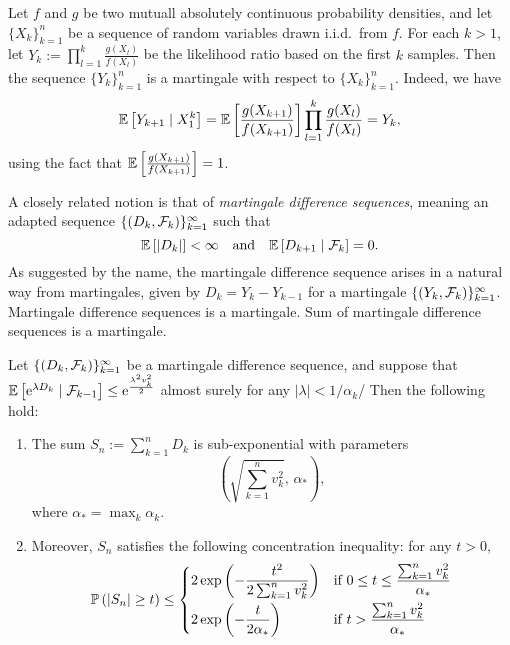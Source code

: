 \begin{example}
	Let \(f\) and \(g\) be two mutuall absolutely continuous probability densities, and let \(\{X_{k}\}_{k=1}^{n}\) be a sequence of random variables drawn i.i.d.\ from \(f\). For each \(k>1\), let \(Y_{k}:=\prod_{l=1}^{k}\frac{g(X_{l})}{f(X_{l})}\) be the likelihood ratio based on the first \(k\) samples. Then the sequence \(\{Y_{k}\}_{k=1}^{n}\) is a martingale with respect to \(\{X_{k}\}_{k=1}^{n}\). Indeed, we have
	\begin{equation*}
		\mathbb{E}\left[Y_{k+1}\mid X_{1}^{k}\right]=\mathbb{E}\left[\frac{g(X_{k+1})}{f(X_{k+1})}\right]\prod_{l=1}^{k}\frac{g(X_{l})}{f(X_{l})}=Y_{k},
	\end{equation*}
	using the fact that \(\mathbb{E}\left[\frac{g(X_{k+1})}{f(X_{k+1})}\right]=1\).
\end{example}

A closely related notion is that of \textit{martingale difference sequences}, meaning an adapted sequence \(\{(D_{k},\mathcal{F}_{k})\}_{k=1}^{\infty}\) such that
\begin{equation*}
	\mathbb{E}\left[\left|D_{k}\right|\right]<\infty\quad\text{and}\quad\mathbb{E}\left[D_{k+1}\mid\mathcal{F}_{k}\right]=0.
\end{equation*}
As suggested by the name, the martingale difference sequence arises in a natural way from martingales, given by \(D_{k}=Y_{k}-Y_{k-1}\) for a martingale \(\{(Y_{k},\mathcal{F}_{k})\}_{k=1}^{\infty}\).
Martingale difference sequences is a martingale.
Sum of martingale difference sequences is a martingale.

\begin{theorem}
	Let \(\{(D_{k},\mathcal{F}_{k})\}_{k=1}^{\infty}\) be a martingale difference sequence, and suppose that \(\mathbb{E}\left[\mathrm{e}^{\lambda D_{k}}\mid \mathcal{F}_{k-1}\right]\leq\mathrm{e}^{\frac{\lambda^{2}v_{k}^{2}}{2}}\) almost surely for any \(|\lambda|<1/\alpha_{k}\)/ Then the following hold:
	\begin{enumerate}
		\item The sum \(S_{n}:=\sum_{k=1}^{n}D_{k}\) is sub-exponential with parameters
		      \begin{equation*}
			      \left(\sqrt{\sum_{k=1}^{n}v_{k}^{2}},\,\alpha_{*}\right),
		      \end{equation*}
		      where \(\alpha_{*}=\max_{k}\alpha_{k}\).
		\item Moreover, \(S_n\) satisfies the following concentration inequality: for any \(t > 0\),
		      \begin{equation*}
			      \mathbb{P}\left(\left|S_{n}\right|\geq t\right)\leq
			      \begin{cases}
				      2\exp\left(-\dfrac{t^{2}}{2\sum_{k=1}^{n}v_{k}^{2}}\right) & \text{if } 0 \leq t \leq \dfrac{\sum_{k=1}^{n}v_{k}^{2}}{\alpha_{*}} \\[2ex]
				      2\exp\left(-\dfrac{t}{2\alpha_{*}}\right)                  & \text{if } t > \dfrac{\sum_{k=1}^{n}v_{k}^{2}}{\alpha_{*}}
			      \end{cases}
		      \end{equation*}
	\end{enumerate}
\end{theorem}

